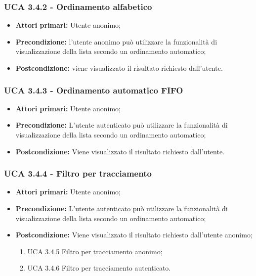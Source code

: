 \subsubsection{UCA 3.4.2 - Ordinamento alfabetico}%
\begin{itemize}
	\item \textbf{Attori primari:} Utente anonimo;
	\item \textbf{Precondizione:} l’utente anonimo può utilizzare la funzionalità di visualizzazione della lista secondo un ordinamento automatico;
	\item \textbf{Postcondizione:} viene visualizzato il risultato richiesto dall’utente.
\end{itemize}

\subsubsection{UCA 3.4.3 - Ordinamento automatico FIFO}%
\begin{itemize}	
	\item \textbf{Attori primari:} Utente anonimo;
	\item \textbf{Precondizione:} L’utente autenticato può utilizzare la funzionalità di visualizzazione della lista secondo un ordinamento automatico;
	\item \textbf{Postcondizione:} Viene visualizzato il risultato richiesto dall’utente.
\end{itemize}

\subsubsection{UCA 3.4.4 - Filtro per tracciamento}%
\begin{itemize}
	\item \textbf{Attori primari:} Utente anonimo;
	\item \textbf{Precondizione:} L’utente autenticato può utilizzare la funzionalità di visualizzazione della lista secondo un ordinamento automatico;
	\item \textbf{Postcondizione:} Viene visualizzato il risultato richiesto dall’utente anonimo;
	\begin{enumerate}
		\item UCA 3.4.5 Filtro per tracciamento anonimo;
		\item UCA 3.4.6 Filtro per tracciamento autenticato.
	\end{enumerate}
\end{itemize}

